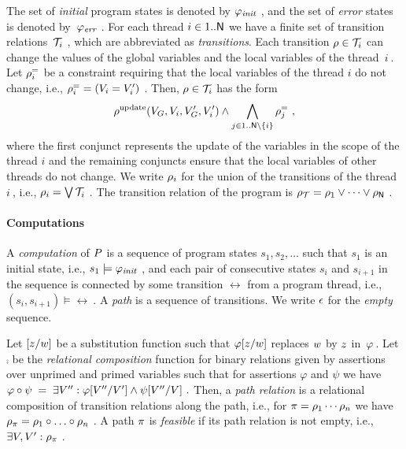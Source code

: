 The set of \emph{initial} program states is denoted by $\varphi_{\mathit{init}}\ $,
and the set of \emph{error} states is denoted by~$\varphi_{\mathit{err}}\ $.
For each thread $i\in1..\mathsf{N}$ we have a finite set of transition
relations~$\mathcal{T}_i\ $, which are abbreviated as \emph{transitions}.
Each transition $\rho \in \mathcal{T}_i$ can change the values of the
global variables and the local variables of the thread~$i\ $. 
Let $\rho^=_{i}$ be a constraint requiring that the local
variables of the thread $i$ do not change, i.e., $\rho^=_{i} =
(V_{i} = V_{i}')\ $.
Then, $\rho \in\mathcal{T}_i$ has the form
%
\begin{equation*}
  \rho^{\text{update}}(V_G, V_{i}, V_G', V_{i}') \land
  \bigwedge_{j\in1..\mathsf{N}\setminus{\{i\}}} \rho^=_{j}\ ,
\end{equation*}
%
where the first conjunct represents the update of the variables in the
scope of the thread $i$ and the remaining conjuncts ensure that the
local variables of other threads do not change.
We write $\rho_{i}$ for the union of the transitions of the thread
$i\ $, i.e., $\rho_{i} = \bigvee \mathcal{T}_i\ $.
The transition relation of the program is $\rho_{\mathcal{T}} =
\rho_{1} \lor \dots \lor \rho_{\mathsf{N}}\ $.




\paragraph{Computations}

A \emph{computation} of $P$ is a sequence of program states
$s_1, s_2, \dots$ such that $s_1$ is an initial state, i.e., $s_1
\models \varphi_{\mathit{init}}\ $, and each pair of consecutive states $s_i$ and
$s_{i+1}$ in the sequence is connected by some transition $\rel$ from
a program thread, i.e., $(s_i, s_{i+1})\models \rel\ $.
A \emph{path} is a sequence of transitions.
We write $\epsilon$ for the \emph{empty} sequence.

Let $[z/w]$ be a substitution function
such that $\varphi[z/w]$ replaces
$w$ by $z$ in~$\varphi\ $.
Let $\comp$ be the \emph{relational composition} function for binary
relations given by assertions over unprimed and primed variables such
that for assertions $\varphi$ and $\psi$ we have
%
$
\varphi \circ \psi \;=\;
\exists V'' : \varphi[V''/V'] \land \psi[V''/V] \ .
$
%
Then, a \emph{path relation} is a relational composition of transition
relations along the path, i.e., for $\pi = \rho_1 \cdots \rho_n$ we
have $\rho_\path = \rho_1 \comp \dots \comp \rho_n\ $. 
A path $\pi$ is \emph{feasible} if its path relation is not empty,
i.e.,~$\exists V, V' : \rho_\pi\ $. 

